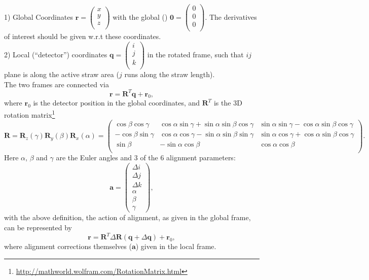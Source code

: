 \documentclass[a4paper,11pt]{article}
\begin{document}
1) Global Coordinates $\textbf{r}=\begin{pmatrix}x\\y\\z\\\end{pmatrix}$ with the global () $\textbf{0}=\begin{pmatrix}0\\0\\0\\\end{pmatrix}$. The derivatives of interest should be given w.r.t these coordinates. \\
2) Local (“detector”) coordinates  $\textbf{q}=\begin{pmatrix}i\\j\\k\\\end{pmatrix}$ in the rotated frame, such that $ij$ plane is along the active straw area ($j$ runs along the straw length). \\

The two frames are connected via
\begin{equation}
\textbf{r}=\textbf{R}^{T}\textbf{q} + \textbf{r}_{0},
\end{equation}
where $\textbf{r}_{0}$ is the detector position in the global coordinates, and $\textbf{R}^T$ is the 3D rotation matrix\footnote{\url{http://mathworld.wolfram.com/RotationMatrix.html}} 
\begin{equation}
\textbf{R}=\textbf{R}_z(\gamma)\textbf{R}_y(\beta)\textbf{R}_x(\alpha) =  
\begin{pmatrix} \cos\beta\cos\gamma & \cos\alpha\sin\gamma + \sin\alpha\sin\beta\cos\gamma & \sin\alpha\sin\gamma - \cos\alpha\sin\beta\cos\gamma \\
-\cos\beta\sin\gamma & \cos\alpha\cos\gamma - \sin\alpha\sin\beta\sin\gamma & \sin\alpha\cos\gamma + \cos\alpha\sin\beta\cos\gamma\\
\sin\beta & - \sin\alpha\cos\beta & \cos\alpha\cos\beta\\\end{pmatrix}.
\end{equation}
Here $\alpha$, $\beta$ and $\gamma$ are the Euler angles and 3 of the 6 alignment parameters:
\begin{equation}
\textbf{a} = \begin{pmatrix} \Delta i \\ \Delta j \\ \Delta k \\ \alpha \\ \beta \\ \gamma \end{pmatrix},
\end{equation}
with the above definition, the action of alignment, as given in the global frame, can be represented by
\begin{equation}
\textbf{r}=\textbf{R}^{T}\Delta\textbf{R}(\textbf{q}+\Delta\textbf{q}) + \textbf{r}_{0},
\end{equation}
where alignment corrections themselves ($\textbf{a}$) given in the local frame. 
\end{document}
